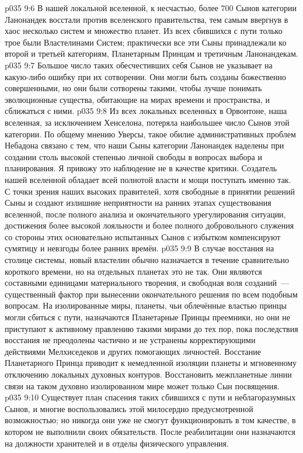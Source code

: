 \vs p035 9:6 В нашей локальной вселенной, к несчастью, более 700 Сынов категории Ланонандек восстали против вселенского правительства, тем самым ввергнув в хаос несколько систем и множество планет. Из всех сбившихся с пути только трое были Властелинами Систем; практически все эти Сыны принадлежали ко второй и третьей категориям, Планетарным Принцам и третичным Ланонандекам.
\vs p035 9:7 Большое число таких обесчестивших себя Сынов не указывает на какую\hyp{}либо ошибку при их сотворении. Они могли быть созданы божественно совершенными, но они были сотворены такими, чтобы лучше понимать эволюционные существа, обитающие на мирах времени и пространства, и сближаться с ними.
\vs p035 9:8 Из всех локальных вселенных в Орвонтоне, наша вселенная, за исключением Хенселона, потеряла наибольшее число Сынов этой категории. По общему мнению Уверсы, такое обилие административных проблем Небадона связано с тем, что наши Сыны категории Ланонандек наделены при создании столь высокой степенью личной свободы в вопросах выбора и планирования. Я привожу это наблюдение не в качестве критики. Создатель нашей вселенной обладает всей полнотой власти и мощи поступать именно так. С точки зрения наших высоких правителей, хотя свободные в принятии решений Сыны и создают излишние неприятности на ранних этапах существования вселенной, после полного анализа и окончательного урегулирования ситуации, достижения более высокой лояльности и более полного добровольного служения со стороны этих основательно испытанных Сынов с избытком компенсируют сумятицу и невзгоды более ранних времён.
\vs p035 9:9 \pc В случае восстания на столице системы, новый властелин обычно назначается в течение сравнительно короткого времени, но на отдельных планетах это не так. Они являются составными единицами материального творения, и свободная воля созданий~--- существенный фактор при вынесении окончательного решения по всем подобным вопросам. На изолированные миры, планеты, чьи облечённые властью принцы могли сбиться с пути, назначаются Планетарные Принцы преемники, но они не приступают к активному правлению такими мирами до тех пор, пока последствия восстания не преодолены частично и не устранены корректирующими действиями Мелхиседеков и других помогающих личностей. Восстание Планетарного Принца приводит к немедленной изоляции планеты и мгновенному отключению локальных духовных контуров. Восстановить межпланетные линии связи на таком духовно изолированном мире может только Сын посвящения.
\vs p035 9:10 Существует план спасения таких сбившихся с пути и неблагоразумных Сынов, и многие воспользовались этой милосердно предусмотренной возможностью; но никогда они уже не смогут функционировать в том качестве, в котором не выполнили своих обязательств. После реабилитации они назначаются на должности хранителей и в отделы физического управления.
